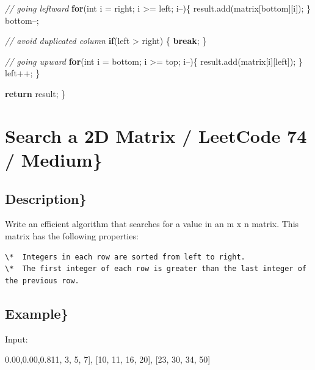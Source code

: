 \documentclass[]{book}
\newenvironment{Shaded}{\begin{snugshade}}{\end{snugshade}}
\newcommand{\CommentTok}[1]{\textcolor[rgb]{0.56,0.35,0.01}{\textit{#1}}}
\newcommand{\DataTypeTok}[1]{\textcolor[rgb]{0.13,0.29,0.53}{#1}}
\newcommand{\DecValTok}[1]{\textcolor[rgb]{0.00,0.00,0.81}{#1}}
\newcommand{\FunctionTok}[1]{\textcolor[rgb]{0.00,0.00,0.00}{#1}}
\newcommand{\KeywordTok}[1]{\textcolor[rgb]{0.13,0.29,0.53}{\textbf{#1}}}
\newcommand{\NormalTok}[1]{#1}
\begin{document}
\begin{Shaded}
\begin{Highlighting}[]
        \CommentTok{// going leftward}
        \KeywordTok{for}\NormalTok{(}\DataTypeTok{int}\NormalTok{ i = right; i >= left; i--)\{}
\NormalTok{            result.}\FunctionTok{add}\NormalTok{(matrix[bottom][i]);}
\NormalTok{        \}}
\NormalTok{        bottom--;}

        \CommentTok{// avoid duplicated column}
        \KeywordTok{if}\NormalTok{(left > right) \{}
            \KeywordTok{break}\NormalTok{;}
\NormalTok{        \}}

        \CommentTok{// going upward}
        \KeywordTok{for}\NormalTok{(}\DataTypeTok{int}\NormalTok{ i = bottom; i >= top; i--)\{}
\NormalTok{            result.}\FunctionTok{add}\NormalTok{(matrix[i][left]);}
\NormalTok{        \}}
\NormalTok{        left++;}
\NormalTok{    \}}

    \KeywordTok{return}\NormalTok{ result;}
\NormalTok{\}}
\end{Highlighting}
\end{Shaded}

\hypertarget{search-a-2d-matrix-leetcode-74-medium}{%
\section{Search a 2D Matrix / LeetCode 74 / Medium\}}\label{search-a-2d-matrix-leetcode-74-medium}}

\hypertarget{description-43}{%
\subsection{Description\}}\label{description-43}}

Write an efficient algorithm that searches for a value in an m x n matrix. This matrix has the following properties:

\begin{verbatim}
\*  Integers in each row are sorted from left to right.
\*  The first integer of each row is greater than the last integer of the previous row.
\end{verbatim}

\hypertarget{example-42}{%
\subsection{Example\}}\label{example-42}}

Input:

\begin{Shaded}
\begin{Highlighting}[]
\NormalTok{[}\DecValTok{1}\NormalTok{,   }\DecValTok{3}\NormalTok{,  }\DecValTok{5}\NormalTok{,  }\DecValTok{7}\NormalTok{],}
\NormalTok{[}\DecValTok{10}\NormalTok{, }\DecValTok{11}\NormalTok{, }\DecValTok{16}\NormalTok{, }\DecValTok{20}\NormalTok{],}
\NormalTok{[}\DecValTok{23}\NormalTok{, }\DecValTok{30}\NormalTok{, }\DecValTok{34}\NormalTok{, }\DecValTok{50}\NormalTok{]}
\end{Highlighting}
\end{Shaded}
\end{document}

